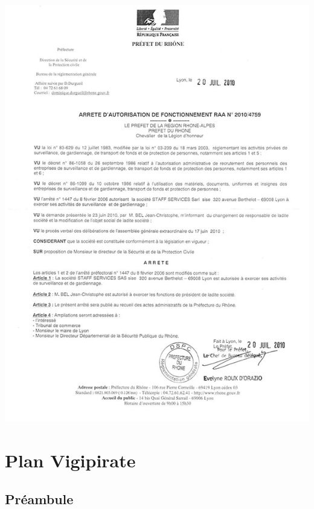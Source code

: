 \documentclass[hidelinks, paper=a4, fontsize=13pt]{report}
\begin{document}
\begin{center}
	\includegraphics[scale=0.70]{Annexes/Documents/ArreteSTAFF}
\end{center}


\newpage

\chapter{Plan Vigipirate}
\label{refVigipirate}

\section{Préambule}
\end{document}
